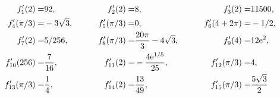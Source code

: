 {
\begin{align*}
f_1'(2) =&    92                      ,\,&\quad&& 
f_2'(2) =&    8                       ,\,&\quad&& 
f_3'(2) =&    11500                   ,\, \\     
f_4'(\pi/3) =& -3\sqrt 3              ,\,&\quad&&
f_5'(\pi/3) =& 0                      ,\,&\quad&&
f_6'(4+2\pi) =& -1/2                  ,\, \\     
f_7'(2)=& 5/256                       ,\,&\quad&&
f_8'(\pi/3)=&\frac{20\pi}3-4\sqrt 3   ,\,&\quad&&
f_9'(4)  =&12\mathrm{e}^{2}                   ,\, \\     
f_{10}'(256)=&\frac 7{16}             ,\,&\quad&&
f_{11}'(2)=&-\frac{4\mathrm{e}^{1/5}}{25}     ,\,&\quad&&                
f_{12}'(\pi/3)=&4                     ,\, \\     
f_{13}'(\pi/3)=&\frac 14              ,\,&\quad&&
f_{14}'(2)=&\frac{13}{49}             ,\,&\quad&&
f_{15}'(\pi/3)=&\frac{5\sqrt 3}2         
\end{align*}                         
                                     
}                                    
